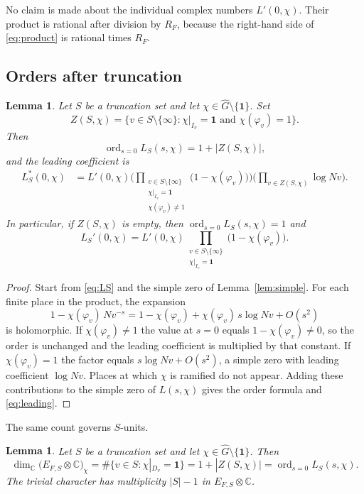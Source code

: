 \documentclass[11pt]{article}
\theoremstyle{plain}
\newtheorem{lemma}[theorem]{Lemma}
\theoremstyle{definition}
\theoremstyle{remark}
\newcommand{\C}{\mathbb{C}}
\newcommand{\ord}{\operatorname{ord}}
\newcommand{\triv}{\mathbf{1}}
\begin{document}
No claim is made about the individual complex numbers $L'(0,\chi)$.
Their product is rational after division by $R_F$, because the right-hand side of \eqref{eq:product} is rational times $R_F$.

\subsection{Orders after truncation}

\begin{lemma}
\label{lem:order}
Let $S$ be a truncation set and let $\chi\in\widehat G\setminus\{\triv\}$.
Set
\[
  Z(S,\chi)
  =\bigl\{v\in S\setminus\{\infty\}:\chi|_{I_v}=\triv\text{ and }\chi(\varphi_v)=1\bigr\}.
\]
Then
\[
  \ord_{s=0}L_S(s,\chi)=1+|Z(S,\chi)|,
\]
and the leading coefficient is
\begin{equation}
\label{eq:leading}
\begin{aligned}
  L_S^{*}(0,\chi)
  &=L'(0,\chi)
    \Biggl(\prod_{\substack{v\in S\setminus\{\infty\}\\ \chi|_{I_v}=\triv\\ \chi(\varphi_v)\neq 1}}
      \bigl(1-\chi(\varphi_v)\bigr)\Biggr)
    \Biggl(\prod_{v\in Z(S,\chi)}\log Nv\Biggr).
\end{aligned}
\end{equation}
In particular, if $Z(S,\chi)$ is empty, then $\ord_{s=0}L_S(s,\chi)=1$ and
\[
  L_S'(0,\chi)
  =L'(0,\chi)\prod_{\substack{v\in S\setminus\{\infty\}\\ \chi|_{I_v}=\triv}}\bigl(1-\chi(\varphi_v)\bigr).
\]
\end{lemma}

\begin{proof}
Start from \eqref{eq:LS} and the simple zero of Lemma~\ref{lem:simple}.
For each finite place in the product, the expansion
\[
  1-\chi(\varphi_v)\,Nv^{-s}
  =1-\chi(\varphi_v)+\chi(\varphi_v)\,s\log Nv+O(s^2)
\]
is holomorphic.
If $\chi(\varphi_v)\neq 1$ the value at $s=0$ equals $1-\chi(\varphi_v)\neq 0$, so the order is unchanged and the leading coefficient is multiplied by that constant.
If $\chi(\varphi_v)=1$ the factor equals $s\log Nv+O(s^2)$, a simple zero with leading coefficient $\log Nv$.
Places at which $\chi$ is ramified do not appear.
Adding these contributions to the simple zero of $L(s,\chi)$ gives the order formula and \eqref{eq:leading}.
\end{proof}

The same count governs $S$-units.

\begin{lemma}
\label{lem:mult}
Let $S$ be a truncation set and let $\chi\in\widehat G\setminus\{\triv\}$.
Then
\[
  \dim_{\C}\bigl(E_{F,S}\otimes\C\bigr)_{\chi}
  =\#\{v\in S:\chi|_{D_v}=\triv\}
  =1+|Z(S,\chi)|
  =\ord_{s=0}L_S(s,\chi).
\]
The trivial character has multiplicity $|S|-1$ in $E_{F,S}\otimes\C$.
\end{lemma}
\end{document}
